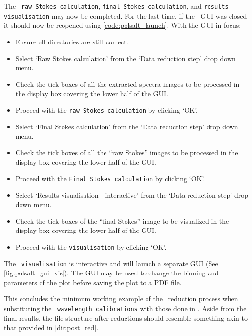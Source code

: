 The \polsalt\ \texttt{raw Stokes calculation}, \texttt{final Stokes calculation}, and \texttt{results visualisation} may now be completed. For the last time, if the \polsalt\ \gls{GUI} was closed it should now be reopened using \autoref{code:polsalt_launch}. With the \gls{GUI} in focus:
\begin{itemize}
    \item Ensure all directories are still correct.
    \item Select `Raw Stokes calculation' from the `Data reduction step' drop down menu.
    \item Check the tick boxes of all the extracted spectra images to be processed in the display box covering the lower half of the \gls{GUI}.
    \item Proceed with the \texttt{raw Stokes calculation} by clicking `OK'.
    \item Select `Final Stokes calculation' from the `Data reduction step' drop down menu.
    \item Check the tick boxes of all the ``raw Stokes'' images to be processed in the display box covering the lower half of the \gls{GUI}.
    \item Proceed with the \texttt{Final Stokes calculation} by clicking `OK'.
    \item Select `Results visualisation - interactive' from the `Data reduction step' drop down menu.
    \item Check the tick boxes of the ``final Stokes'' image to be visualized in the display box covering the lower half of the \gls{GUI}.
    \item Proceed with the \texttt{visualisation} by clicking `OK'.
\end{itemize}

The \polsalt\ \texttt{visualisation} is interactive and will launch a separate \gls{GUI} (See \autoref{fig:polsalt_gui_vis}). The \gls{GUI} may be used to change the binning and parameters of the plot before saving the plot to a PDF file.

This concludes the minimum working example of the \polsalt\ reduction process when substituting the \polsalt\ \texttt{wavelength calibrations} with those done in \iraf. Aside from the final results, the file structure after reductions should resemble something akin to that provided in \autoref{dir:post_red}.

